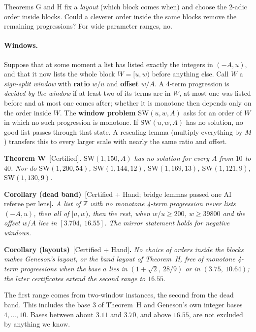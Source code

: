 \documentclass[11pt,letterpaper]{article}
\newcommand{\Z}{\mathbb{Z}}
\newcommand{\SW}{\mathrm{SW}}
\newcommand{\st}[1]{\textnormal{\textsf{\small[#1]}}}
\newenvironment{result}[2]%
  {\par\medskip\noindent\textbf{#1}\ \st{#2}\textbf{.}\enspace\itshape}%
  {\par\medskip}
\begin{document}
Theorems G and H fix a \emph{layout} (which block comes when) and choose the 2-adic order inside blocks.
Could a cleverer order inside the same blocks remove the remaining progressions? For wide parameter ranges,
no.

\paragraph{Windows.} Suppose that at some moment a list has listed exactly the integers in $(-A, u)$, and
that it now lists the whole block $W = [u, w)$ before anything else. Call $W$ a \emph{sign-split window}
with \textbf{ratio} $w/u$ and \textbf{offset} $w/A$. A 4-term progression is \emph{decided by the window} if
at least two of its terms are in $W$, at most one was listed before and at most one comes after; whether it
is monotone then depends only on the order inside $W$. The \textbf{window problem} $\SW(u,w,A)$ asks for an
order of $W$ in which no such progression is monotone. If $\SW(u,w,A)$ has no solution, no good list passes
through that state. A rescaling lemma (multiply everything by $M$) transfers this to every larger scale with
nearly the same ratio and offset.

\begin{result}{Theorem W}{Certified}
$\SW(1,150,A)$ has no solution for every $A$ from $10$ to $40$. Nor do $\SW(1,200,54)$, $\SW(1,144,12)$,
$\SW(1,169,13)$, $\SW(1,121,9)$, $\SW(1,130,9)$.
\end{result}

\begin{result}{Corollary (dead band)}{Certified + Hand; bridge lemmas passed one AI referee per lens}
A list of $\Z$ with no monotone 4-term progression never lists $(-A,u)$, then all of $[u,w)$, then the
rest, when $w/u \ge 200$, $w \ge 39800$ and the offset $w/A$ lies in $[3.704,\ 16.55]$. The mirror statement
holds for negative windows.
\end{result}

\begin{result}{Corollary (layouts)}{Certified + Hand}
No choice of orders inside the blocks makes Geneson's layout, or the band layout of Theorem~H, free of
monotone 4-term progressions when the base $a$ lies in $(1+\sqrt2,\ 28/9)$ or in $(3.75,\ 10.64)$; the later
certificates extend the second range to $16.55$.
\end{result}

The first range comes from two-window instances, the second from the dead band. This includes the base 3 of
Theorem~H and Geneson's own integer bases $4, \dots, 10$. Bases between about $3.11$ and $3.70$, and above
$16.55$, are not excluded by anything we know.
\end{document}
